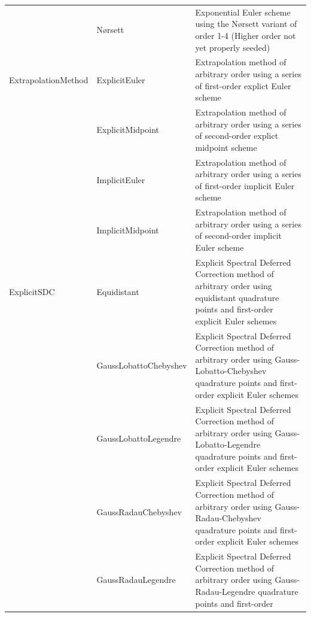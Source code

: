 \begin{center}
\begin{tabular}{p{2.5cm}p{4cm}p{8cm}}
                 & N{\o}rsett & Exponential Euler scheme using the
                                N{\o}rsett variant of order 1-4
                                (Higher order not yet properly seeded) \\
ExtrapolationMethod & ExplicitEuler & Extrapolation method of arbitrary order
                                      using a series of first-order explict Euler
                                      scheme\\
                    & ExplicitMidpoint & Extrapolation method of arbitrary order
                                      using a series of second-order explict midpoint
                                      scheme\\
                    & ImplicitEuler & Extrapolation method of arbitrary order
                                      using a series of first-order implicit Euler
                                      scheme\\
                    & ImplicitMidpoint & Extrapolation method of arbitrary order
                                         using a series of second-order implicit Euler
                                         scheme\\
ExplicitSDC & Equidistant & Explicit Spectral Deferred Correction method of arbitrary order
                            using equidistant quadrature points and first-order explicit
                            Euler schemes\\
            & GaussLobattoChebyshev & Explicit Spectral Deferred Correction method of arbitrary order
                                      using Gauss-Lobatto-Chebyshev quadrature points and first-order
                                      explicit Euler schemes\\
            & GaussLobattoLegendre & Explicit Spectral Deferred Correction method of arbitrary order
                                     using Gauss-Lobatto-Legendre quadrature points and first-order
                                     explicit Euler schemes\\
            & GaussRadauChebyshev & Explicit Spectral Deferred Correction method of arbitrary order
                                    using Gauss-Radau-Chebyshev quadrature points and first-order
                                    explicit Euler schemes\\
            & GaussRadauLegendre & Explicit Spectral Deferred Correction method of arbitrary order
                                   using Gauss-Radau-Legendre quadrature points and first-order

\end{tabular}
\end{center}
